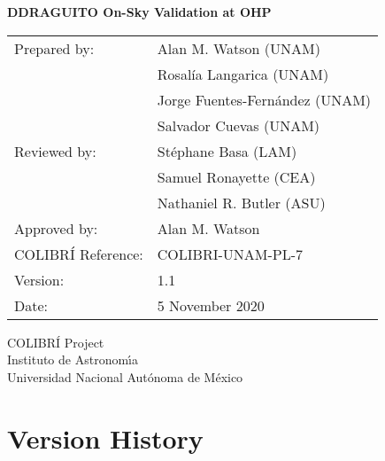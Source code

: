 \documentclass{article}
\begin{document}
\pagestyle{empty}

\begin{center}

{\Large \bfseries DDRAGUITO On-Sky Validation at OHP}

\vspace{2cm}

\begin{tabular}{ll}
Prepared by:&Alan M. Watson (UNAM)\\
&Rosalía Langarica (UNAM)\\
&Jorge Fuentes-Fernández (UNAM)\\
&Salvador Cuevas (UNAM)\\
Reviewed by:&Stéphane Basa (LAM)\\
&Samuel Ronayette (CEA)\\
&Nathaniel R. Butler (ASU)\\
Approved by:&Alan M. Watson\\
COLIBRÍ Reference:&COLIBRI-UNAM-PL-7\\
Version:&1.1\\
Date:&5 November 2020\\
\end{tabular}

\vspace{\fill}

COLIBRÍ Project\\
Instituto de Astronom{\'\i}a\\
Universidad Nacional Aut\'onoma de M\'exico

\end{center}

\newpage


\pagestyle{plain}

\setcounter{tocdepth}{2}
\tableofcontents
\newpage




\clearpage
\section*{Version History}
\end{document}
